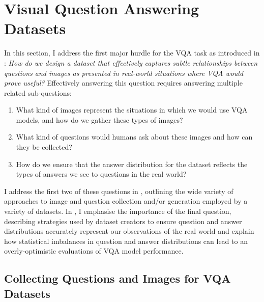 



\section{Visual Question Answering Datasets}
\label{section:vqa_datasets}

In this section, I address the first major hurdle for the VQA task as introduced in \chapterautorefname{  \ref{chapter:introduction}}: \textit{How do we design a dataset that effectively captures subtle relationships between questions and images as presented in real-world situations where VQA would prove useful?} Effectively answering this question requires answering multiple related sub-questions:

\begin{enumerate}
    \item What kind of images represent the situations in which we would use VQA models, and how do we gather these types of images?
    \item What kind of questions would humans ask about these images and how can they be collected?
    \item How do we ensure that the answer distribution for the dataset reflects the types of answers we see to questions in the real world?
\end{enumerate}

I address the first two of these questions in \subsectionautorefname{ \ref{subsection:question_and_image_collection}}, outlining the wide variety of approaches to image and question collection and/or generation employed by a variety of datasets. In \subsectionautorefname{ \ref{subsec:lanauge_priors_in_vqa_datasets}}, I emphasise the importance of the final question, describing strategies used by dataset creators to ensure question and answer distributions accurately represent our observations of the real world and explain how statistical imbalances in question and answer distributions can lead to an overly-optimistic evaluations of VQA model performance.

\subsection{Collecting Questions and Images for VQA Datasets}
\label{subsection:question_and_image_collection}


